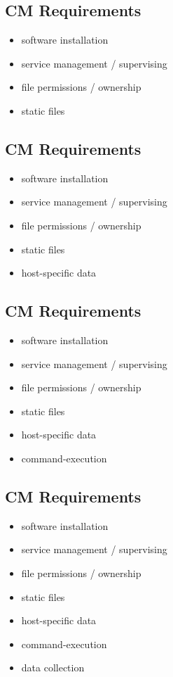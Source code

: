 \documentclass[xga]{xdvislides}
\begin{document}
\subsection{CM Requirements}
\begin{itemize}
	\item software installation
	\item service management / supervising
	\item file permissions / ownership
	\item static files
\end{itemize}

\subsection{CM Requirements}
\begin{itemize}
	\item software installation
	\item service management / supervising
	\item file permissions / ownership
	\item static files
	\item host-specific data
\end{itemize}

\subsection{CM Requirements}
\begin{itemize}
	\item software installation
	\item service management / supervising
	\item file permissions / ownership
	\item static files
	\item host-specific data
\end{itemize}
\vspace{.25in}
\begin{itemize}
	\item command-execution
\end{itemize}

\subsection{CM Requirements}
\begin{itemize}
	\item software installation
	\item service management / supervising
	\item file permissions / ownership
	\item static files
	\item host-specific data
\end{itemize}
\vspace{.25in}
\begin{itemize}
	\item command-execution
	\item data collection
\end{itemize}
\end{document}
